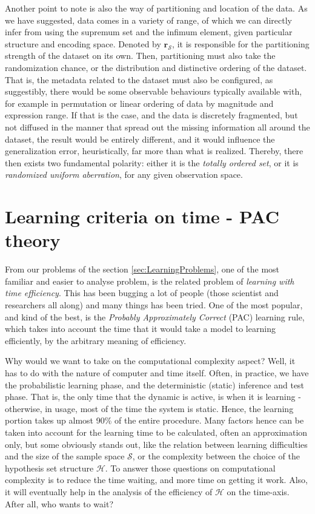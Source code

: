 Another point to note is also the way of partitioning and location of the data. As we have suggested, data comes in a variety of range, of which we can directly infer from using the supremum set and the infimum element, given particular structure and encoding space. Denoted by $\mathbf{r}_{\mathcal{S}}$, it is responsible for the partitioning strength of the dataset on its own. Then, partitioning must also take the randomization chance, or the distribution and distinctive ordering of the dataset. That is, the metadata related to the dataset must also be configured, as suggestibly, there would be some observable behaviours typically available with, for example in permutation or linear ordering of data by magnitude and expression range. If that is the case, and the data is discretely fragmented, but not diffused in the manner that spread out the missing information all around the dataset, the result would be entirely different, and it would influence the generalization error, heuristically, far more than what is realized. Thereby, there then exists two fundamental polarity: either it is the \textit{totally ordered set}, or it is \textit{randomized uniform aberration}, for any given observation space. 

\section{Learning criteria on time - PAC theory}

From our problems of the section \ref{sec:LearningProblems}, one of the most familiar and easier to analyse problem, is the related problem of \textit{learning with time efficiency}. This has been bugging a lot of people (those scientist and researchers all along) and many things has been tried. One of the most popular, and kind of the best, is the \textit{Probably Approximately Correct} (PAC) learning rule, which takes into account the time that it would take a model to learning efficiently, by the arbitrary meaning of efficiency.  

Why would we want to take on the computational complexity aspect? Well, it has to do with the nature of computer and time itself. Often, in practice, we have the probabilistic learning phase, and the deterministic (static) inference and test phase. That is, the only time that the dynamic is active, is when it is learning - otherwise, in usage, most of the time the system is static. Hence, the learning portion takes up almost 90\% of the entire procedure. Many factors hence can be taken into account for the learning time to be calculated, often an approximation only, but some obviously stands out, like the relation between learning difficulties and the size of the sample space $\mathcal{S}$, or the complexity between the choice of the hypothesis set structure $\mathcal{H}$. To answer those questions on computational complexity is to reduce the time waiting, and more time on getting it work. Also, it will eventually help in the analysis of the efficiency of $\mathcal{H}$ on the time-axis. After all, who wants to wait?

